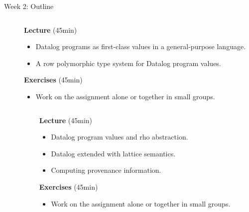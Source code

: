 \begin{frame}[standout]
\end{frame}

\begin{frame}{Week 2: Outline}
\color{gray}
\begin{columns}
\begin{column}{.05\textwidth}
\end{column}
\begin{column}{.95\textwidth}
    \footnotesize
\textbf{Lecture} (45min)  \vspace{-2mm}
\begin{itemize}
    \color{gray}
    \setlength\itemsep{-0.5em}
    \item Datalog programs as first-class values in a general-purpose language.
    \item A row polymorphic type system for Datalog program values.
\end{itemize}
\textbf{Exercises} (45min) \vspace{-2mm}
\begin{itemize}
    \color{gray}
    \item Work on the assignment alone or together in small groups.
\end{itemize}
\end{column}
\end{columns}

\medskip
\medskip
\medskip

\color{black}
\begin{columns}
\begin{column}{.05\textwidth}
\end{column}
\begin{column}{.95\textwidth}
\footnotesize
\textbf{Lecture} (45min) \vspace{-2mm}
\begin{itemize}
    \setlength\itemsep{-0.5em}
    \item Datalog program values and rho abstraction.
    \item Datalog extended with lattice semantics.
    \item Computing provenance information.
\end{itemize}
\textbf{Exercises} (45min)  \vspace{-2mm}
\begin{itemize}
    \item Work on the assignment alone or together in small groups.
\end{itemize}
\end{column}
\end{columns}
\end{frame}

